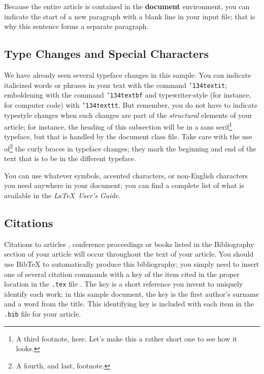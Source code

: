 \documentclass{acm_proc_article-sp}
\begin{document}
Because the entire article is contained in
the \textbf{document} environment, you can indicate the
start of a new paragraph with a blank line in your
input file; that is why this sentence forms a separate paragraph.

\subsection{Type Changes and {\subsecit Special} Characters}
We have already seen several typeface changes in this sample.  You
can indicate italicized words or phrases in your text with
the command \texttt{{\char'134}textit}; emboldening with the
command \texttt{{\char'134}textbf}
and typewriter-style (for instance, for computer code) with
\texttt{{\char'134}texttt}.  But remember, you do not
have to indicate typestyle changes when such changes are
part of the \textit{structural} elements of your
article; for instance, the heading of this subsection will
be in a sans serif\footnote{A third footnote, here.
Let's make this a rather short one to
see how it looks.} typeface, but that is handled by the
document class file. Take care with the use
of\footnote{A fourth, and last, footnote.}
the curly braces in typeface changes; they mark
the beginning and end of
the text that is to be in the different typeface.

You can use whatever symbols, accented characters, or
non-English characters you need anywhere in your document;
you can find a complete list of what is
available in the \textit{\LaTeX\
User's Guide}\cite{Lamport:LaTeX}.

\subsection{Citations}
Citations to articles \cite{bowman:reasoning, clark:pct, braams:babel, herlihy:methodology},
conference
proceedings \cite{clark:pct} or books \cite{salas:calculus, Lamport:LaTeX} listed
in the Bibliography section of your
article will occur throughout the text of your article.
You should use BibTeX to automatically produce this bibliography;
you simply need to insert one of several citation commands with
a key of the item cited in the proper location in
the \texttt{.tex} file \cite{Lamport:LaTeX}.
The key is a short reference you invent to uniquely
identify each work; in this sample document, the key is
the first author's surname and a
word from the title.  This identifying key is included
with each item in the \texttt{.bib} file for your article.
\end{document}
